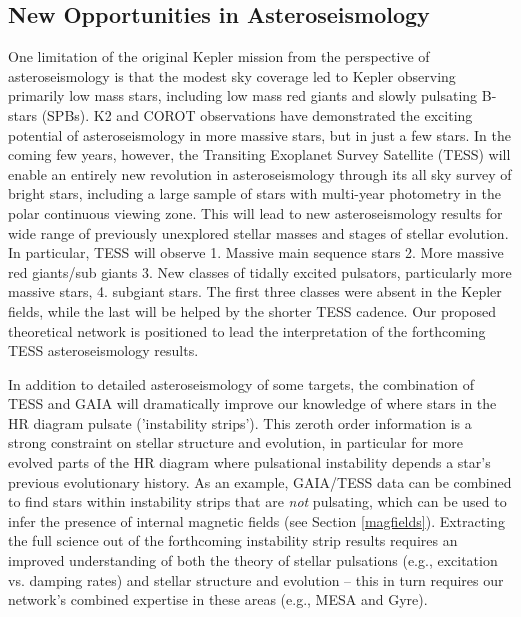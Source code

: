 \subsection{New Opportunities in Asteroseismology}

One limitation of the original Kepler mission from the perspective of asteroseismology is that the modest sky coverage led to Kepler observing primarily low mass stars, including low mass red giants and slowly pulsating B-stars (SPBs).  K2 and COROT observations have demonstrated the exciting potential of asteroseismology in more massive stars, but in just a few stars.   In the coming few years, however, the Transiting Exoplanet Survey Satellite (TESS) will enable an entirely new revolution in asteroseismology through its all sky survey of bright stars, including a large sample of stars with multi-year photometry in the polar continuous viewing zone. This will lead to new asteroseismology results for wide range of previously unexplored stellar masses and stages of stellar evolution. In particular, TESS will observe 1.  Massive main sequence stars 2. More massive red giants/sub giants 3. New classes of tidally excited pulsators, particularly more massive stars, 4. subgiant stars. The first three classes were absent in the Kepler fields, while the last will be helped by the shorter TESS cadence.   Our proposed theoretical network is positioned to lead the interpretation of the forthcoming TESS asteroseismology results.  

In addition to detailed asteroseismology of some targets, the combination of TESS and GAIA will dramatically improve our knowledge of where stars in the HR diagram pulsate ('instability strips').   This zeroth order information is  a strong constraint on stellar structure and evolution, in particular for more evolved parts of the HR diagram where pulsational instability depends a star's previous evolutionary history. As an example, GAIA/TESS data can be combined to find stars within instability strips that are {\it not} pulsating, which can be used to infer the presence of internal magnetic fields (see Section \ref{magfields}). Extracting the full science out of the forthcoming instability strip results requires an improved understanding of both the theory of stellar pulsations (e.g., excitation vs. damping rates) and stellar structure and evolution -- this in turn requires our network's combined expertise in these areas (e.g., MESA and Gyre).
